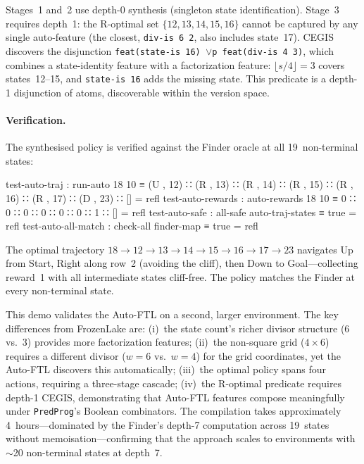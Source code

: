 \noindent Stages~1 and~2 use depth-0 synthesis (singleton state identification).  Stage~3 requires depth~1: the R-optimal set $\{12, 13, 14, 15, 16\}$ cannot be captured by any single auto-feature (the closest, \texttt{div-is~6~2}, also includes state~17).  CEGIS discovers the disjunction \texttt{feat(state-is~16) $\vee$p feat(div-is~4~3)}, which combines a state-identity feature with a factorization feature: $\lfloor s / 4 \rfloor = 3$ covers states~12--15, and \texttt{state-is~16} adds the missing state.  This predicate is a depth-1 disjunction of atoms, discoverable within the version space.

\paragraph{Verification.}
The synthesised policy is verified against the Finder oracle at all 19~non-terminal states:

\begin{spec}
test-auto-traj : run-auto 18 10
  ≡ (U , 12) ∷ (R , 13) ∷ (R , 14) ∷ (R , 15) ∷
    (R , 16) ∷ (R , 17) ∷ (D , 23) ∷ []           = refl
test-auto-rewards  : auto-rewards 18 10 ≡ 0 ∷ 0 ∷ 0 ∷ 0 ∷ 0 ∷ 0 ∷ 1 ∷ []  = refl
test-auto-safe     : all-safe auto-traj-states ≡ true                         = refl
test-auto-all-match : check-all finder-map ≡ true                             = refl
\end{spec}

\noindent The optimal trajectory $18 \to 12 \to 13 \to 14 \to 15 \to 16 \to 17 \to 23$ navigates Up from Start, Right along row~2 (avoiding the cliff), then Down to Goal---collecting reward~1 with all intermediate states cliff-free.  The policy matches the Finder at every non-terminal state.

\begin{remark}
This demo validates the Auto-FTL on a second, larger environment.  The key differences from FrozenLake are: (i)~the state count's richer divisor structure (6 vs.\ 3) provides more factorization features; (ii)~the non-square grid ($4 \times 6$) requires a different divisor ($w = 6$ vs.\ $w = 4$) for the grid coordinates, yet the Auto-FTL discovers this automatically; (iii)~the optimal policy spans four actions, requiring a three-stage cascade; (iv)~the R-optimal predicate requires depth-1 CEGIS, demonstrating that Auto-FTL features compose meaningfully under \texttt{PredProg}'s Boolean combinators.  The compilation takes approximately 4~hours---dominated by the Finder's depth-7 computation across 19~states without memoisation---confirming that the approach scales to environments with $\sim$20 non-terminal states at depth~7.
\end{remark}


